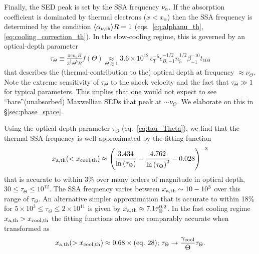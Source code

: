 \documentclass[twocolumn]{aastex63}
\begin{document}
Finally, the SED peak is set by the SSA frequency $\nu_{\rm a}$. If the absorption coefficient is dominated by thermal electrons ($x < x_\alpha$) then the SSA frequency is determined by the condition $\langle \alpha_{\nu,{\rm th}} \rangle R = 1$ (eqs.~\ref{eq:alphanu_th},\ref{eq:cooling_correction_th}).
In the slow-cooling regime, this is governed by an optical-depth parameter
\begin{align}
\label{eq:tau_Theta}
    \tau_\Theta 
    \equiv \frac{\pi e n_e R}{3^\frac{3}{2} \Theta^5 B} f(\Theta)
    \underset{\Theta \gtrsim 1}{\approx} 3.6 \times 10^{12}\, \epsilon_T^{-5} \epsilon_{B,-1}^{-1/2} n_5^{1/2} \beta_{-1}^{-10} t_{100}
\end{align}
that describes the (thermal-contribution to the) optical depth at frequency $\approx \nu_\Theta$.
Note the extreme sensitivity of $\tau_\Theta$ to the shock velocity and the fact that $\tau_\Theta \gg 1$ for typical parameters. This implies that one would not expect to see ``bare''(unabsorbed) Maxwellian SEDs that peak at $\sim \nu_\Theta$. We elaborate on this in \S\ref{sec:phase_space}.

Using the optical-depth parameter $\tau_\Theta$ (eq.~\ref{eq:tau_Theta}), we find that the thermal SSA frequency is well approximated by the fitting function
\begin{equation}
\label{eq:xa_th_slowcooling}
    x_{\rm a,th}(<x_{\rm cool,th}) \approx 
    \left( \frac{3.434}{\ln\left(\tau_\Theta\right)} - \frac{4.762}{\ln\left(\tau_\Theta\right)^2} - 0.028 \right)^{-3}
\end{equation}
that is accurate to within 3\% over many orders of magnitude in optical depth, $30 \leq \tau_\Theta \leq 10^{12}$.
The SSA frequency varies between $x_{\rm a,th} \sim 10-10^3$ over this range of $\tau_\Theta$.
An alternative simpler approximation that is accurate to within 18\% for $5\times10^3 \leq \tau_\Theta \leq 2 \times 10^{11}$ 
is given by $x_{\rm a,th} \approx 7.1 \tau_\Theta^{0.2}$.
In the fast cooling regime $x_{\rm a,th} > x_{\rm cool, th}$ the fitting functions above are comparably accurate when transformed as
\begin{equation}
\label{eq:xa_th_fastcooling}
    x_{\rm a,th}(>x_{\rm cool, th})
    \approx
    0.68 
    \times
    {\rm (eq.~28);~} \tau_\Theta \to 
    \frac{\gamma_{\rm cool}}{\Theta}\tau_\Theta
    .
\end{equation}
\end{document}
